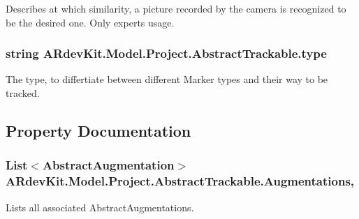 Describes at which similarity, a picture recorded by the camera is recognized to be the desired one. Only experts usage. 

\hypertarget{class_a_rdev_kit_1_1_model_1_1_project_1_1_abstract_trackable_ab6faf8843d1e9a61b353286a8d583231}{
\subsubsection[{type}]{\setlength{\rightskip}{0pt plus 5cm}string A\-Rdev\-Kit.\-Model.\-Project.\-Abstract\-Trackable.\-type\hspace{0.3cm}{\ttfamily [protected]}}}\label{class_a_rdev_kit_1_1_model_1_1_project_1_1_abstract_trackable_ab6faf8843d1e9a61b353286a8d583231}


The type, to differtiate between different Marker types and their way to be tracked. 



\subsection{Property Documentation}
\hypertarget{class_a_rdev_kit_1_1_model_1_1_project_1_1_abstract_trackable_a999faeee63dee9445e8617d539c5b8d9}{
\subsubsection[{Augmentations}]{\setlength{\rightskip}{0pt plus 5cm}List$<${\bf Abstract\-Augmentation}$>$ A\-Rdev\-Kit.\-Model.\-Project.\-Abstract\-Trackable.\-Augmentations\hspace{0.3cm}{\ttfamily [get]}, {\ttfamily [set]}}}\label{class_a_rdev_kit_1_1_model_1_1_project_1_1_abstract_trackable_a999faeee63dee9445e8617d539c5b8d9}


Lists all associated Abstract\-Augmentations. 

